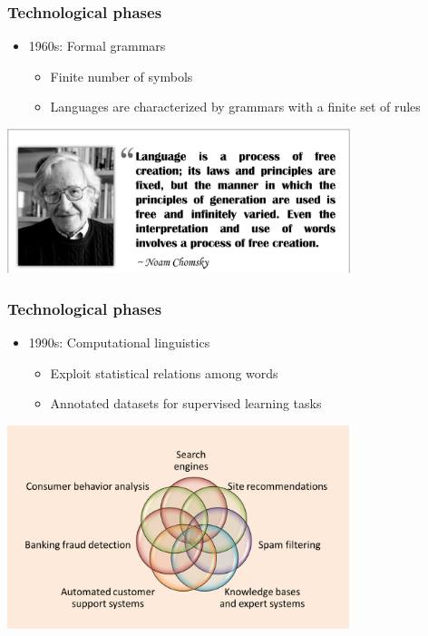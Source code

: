 \documentclass{beamer}
\begin{document}
\begin{frame}

	\frametitle{Technological phases}

\vspace{.3cm}
\begin{itemize}
    \item 1960s: Formal grammars
    \begin{itemize}
        \item Finite number of symbols
        \item Languages are characterized by grammars with a finite set of rules
    \end{itemize}
\end{itemize}
\centerline{\includegraphics[width=10cm]{./figs/chomsky.jpg}}

\end{frame}

\begin{frame}

	\frametitle{Technological phases}

\vspace{.3cm}
\begin{itemize}
    \item 1990s: Computational linguistics
        \begin{itemize}
            \item Exploit statistical relations among words
            \item Annotated datasets for supervised learning tasks
        \end{itemize}

\end{itemize}
\centerline{\includegraphics[width=10cm]{./figs/NLPTM_applications.png}}

\end{frame}
\end{document}
